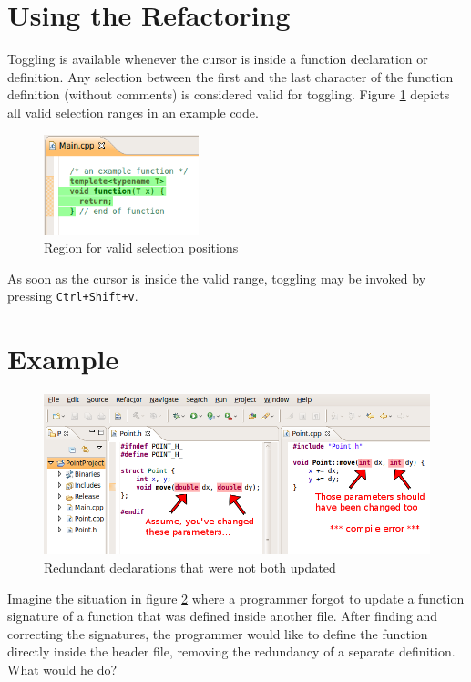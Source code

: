 \section{Using the Refactoring}

Toggling is available whenever the cursor is inside a function declaration 
or definition. Any selection between the first and the last character of 
the function definition (without comments) is considered valid for toggling. 
Figure \ref{selection} depicts all valid selection ranges in an example code.
\begin{figure}[h]
\centering
\includegraphics[width=0.4\textwidth]{images/selection.png}
\caption{Region for valid selection positions}
\label{selection}
\end{figure}
As soon as the cursor is inside the valid range, toggling may be invoked by 
pressing \texttt{Ctrl+Shift+v}.

\section{Example}

\begin{figure}[h]
\centering
\includegraphics[width=\textwidth]{images/differing_signatures.png}
\caption{Redundant declarations that were not both updated}
\label{differingSignatures}
\end{figure}
Imagine the situation in figure \ref{differingSignatures} where a programmer 
forgot to update a function signature of a function that was defined inside 
another file.
After finding and correcting the signatures, the programmer would like to define 
the function directly inside the header file, removing the redundancy of a 
separate definition. What would he do?

